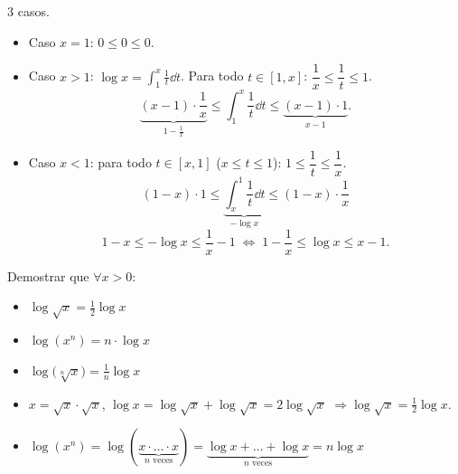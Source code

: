 \documentclass[11pt,a4paper]{article}
\begin{document}
\begin{solucion}
3 casos.
\begin{itemize}
  \item Caso $x=1$: $0\le0\le0$.
  \item Caso $x>1$: $\log x=\displaystyle\int_1^x\frac1t\dd t$. Para todo $t\in[1,x]$: $\dfrac1x\le\dfrac1t\le1$.
  \[
    \underbrace{(x-1)\cdot\frac1x}_{1-\frac1x}\le\int_1^x\frac1t\dd t\le\underbrace{(x-1)\cdot1}_{x-1}.
  \]
  \item Caso $x<1$: para todo $t\in[x,1]$ ($x\le t\le1$): $1\le\dfrac1t\le\dfrac1x$.
  \[
    (1-x)\cdot1\le\underbrace{\int_x^1\frac1t\dd t}_{-\log x}\le(1-x)\cdot\frac1x
  \]
  \[
    1-x\le-\log x\le\frac1x-1
    \;\Longleftrightarrow\;
    1-\frac1x\le\log x\le x-1.
  \]
\end{itemize}
\end{solucion}

\begin{ejercicio}
Demostrar que $\forall x>0$:
\begin{itemize}
  \item $\log\sqrt{x}=\frac12\log x$
  \item $\log(x^n)=n\cdot\log x$
  \item $\log\bigl(\sqrt[n]{x}\bigr)=\frac1n\log x$
\end{itemize}
\end{ejercicio}

\begin{solucion}\leavevmode
\begin{itemize}
  \item $x=\sqrt{x}\cdot\sqrt{x}$, \quad $\log x=\log\sqrt{x}+\log\sqrt{x}=2\log\sqrt{x}$ \quad $\Rightarrow\log\sqrt{x}=\frac12\log x$.
  \item $\displaystyle\log(x^n)=\log(\underbrace{x\cdot\ldots\cdot x}_{n\text{ veces}})
    =\underbrace{\log x+\dots+\log x}_{n\text{ veces}}=n\log x$
\end{itemize}
\end{solucion}

\end{document}
